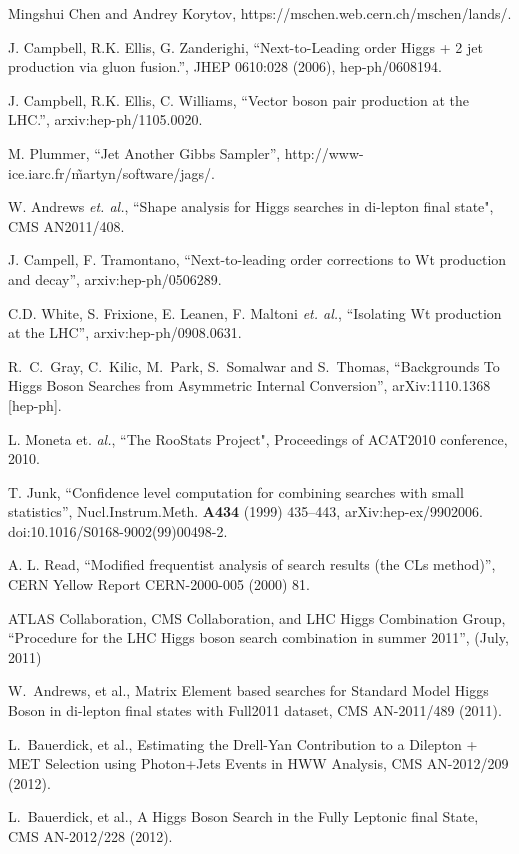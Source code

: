 Mingshui Chen and Andrey Korytov, https://mschen.web.cern.ch/mschen/lands/.

J. Campbell, R.K. Ellis, G. Zanderighi, ``Next-to-Leading order Higgs + 2 jet production via gluon fusion.'', JHEP 0610:028 (2006), hep-ph/0608194.

J. Campbell, R.K. Ellis, C. Williams, ``Vector boson pair production at the LHC.'', arxiv:hep-ph/1105.0020.

M. Plummer, ``Jet Another Gibbs Sampler'', http://www-ice.iarc.fr/\~martyn/software/jags/.

W. Andrews {\it et. al.}, ``Shape analysis for Higgs searches in di-lepton final state", 
CMS AN2011/408.

J. Campell, F. Tramontano, ``Next-to-leading order corrections to Wt production and decay'', arxiv:hep-ph/0506289.

C.D. White, S. Frixione, E. Leanen, F. Maltoni {\it et. al.}, ``Isolating Wt production at the LHC'', arxiv:hep-ph/0908.0631.

  R.~C.~Gray, C.~Kilic, M.~Park, S.~Somalwar and S.~Thomas,
  ``Backgrounds To Higgs Boson Searches from Asymmetric Internal Conversion'',
  arXiv:1110.1368 [hep-ph].

L. Moneta et. {\it al.}, ``The RooStats Project", Proceedings of ACAT2010 conference, 2010.

T. Junk, ``Confidence level computation for combining searches with small statistics'', 
Nucl.Instrum.Meth. {\bf A434} (1999) 435–443, arXiv:hep-ex/9902006. 
doi:10.1016/S0168-9002(99)00498-2.

A. L. Read, ``Modified frequentist analysis of search results (the CLs method)'', 
CERN Yellow Report CERN-2000-005 (2000) 81.

ATLAS Collaboration, CMS Collaboration, and LHC Higgs Combination Group, 
``Procedure for the LHC Higgs boson search combination in summer 2011'', (July, 2011)

W.~Andrews, et al., {Matrix Element based searches for Standard Model Higgs Boson in di-lepton final states with Full2011 dataset}, CMS AN-2011/489 (2011).

L.~Bauerdick, et al., {Estimating the Drell-Yan Contribution to a Dilepton + MET Selection using Photon+Jets Events in HWW Analysis}, CMS AN-2012/209 (2012).

L.~Bauerdick, et al., {A Higgs Boson Search in the Fully Leptonic \WW final State}, CMS AN-2012/228 (2012).

